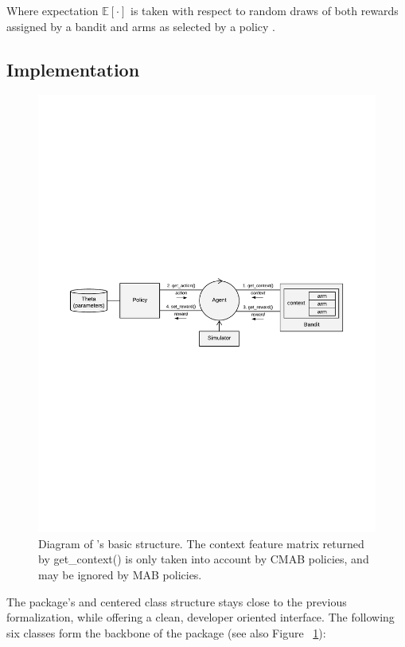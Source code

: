 \documentclass{jss}
\begin{document}
Where expectation $\mathbb{E}\left[ \mathord{\cdot}\right]$ is taken with respect to random draws of both rewards assigned by a bandit and arms as selected by a policy \citep{Zheng2016a}.

\subsection{Implementation} \label{implementation}

\begin{figure}[H]
  \centering
    \includegraphics[width=.99\textwidth]{fig/CMAB_chart}

      \caption{Diagram of 's basic structure. The context feature matrix returned by get\_context() is only taken into account by CMAB policies, and may be ignored by MAB policies.}
      \label{fig:CMAB_chart}
\end{figure}

The package's  and  centered  class structure stays close to the previous formalization, while offering a clean, developer oriented interface. The following six classes form the backbone of the package (see also Figure ~\ref{fig:CMAB_chart}):
\end{document}
